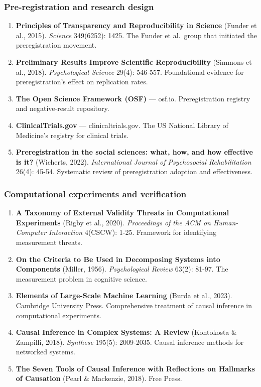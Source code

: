 \documentclass[
]{article}
\begin{document}
\subsubsection{Pre-registration and research
design}\label{pre-registration-and-research-design}

\begin{enumerate}
\def\labelenumi{\arabic{enumi}.}
\setcounter{enumi}{15}
\item
  \textbf{Principles of Transparency and Reproducibility in Science}
  (Funder et al., 2015). \emph{Science} 349(6252): 1425. The Funder et
  al.~group that initiated the preregistration movement.
\item
  \textbf{Preliminary Results Improve Scientific Reproducibility}
  (Simmons et al., 2018). \emph{Psychological Science} 29(4): 546-557.
  Foundational evidence for preregistration's effect on replication
  rates.
\item
  \textbf{The Open Science Framework (OSF)} --- osf.io. Preregistration
  registry and negative-result repository.
\item
  \textbf{ClinicalTrials.gov} --- clinicaltrials.gov. The US National
  Library of Medicine's registry for clinical trials.
\item
  \textbf{Preregistration in the social sciences: what, how, and how
  effective is it?} (Wicherts, 2022). \emph{International Journal of
  Psychosocial Rehabilitation} 26(4): 45-54. Systematic review of
  preregistration adoption and effectiveness.
\end{enumerate}

\subsubsection{Computational experiments and
verification}\label{computational-experiments-and-verification}

\begin{enumerate}
\def\labelenumi{\arabic{enumi}.}
\setcounter{enumi}{20}
\item
  \textbf{A Taxonomy of External Validity Threats in Computational
  Experiments} (Rigby et al., 2020). \emph{Proceedings of the ACM on
  Human-Computer Interaction} 4(CSCW): 1-25. Framework for identifying
  measurement threats.
\item
  \textbf{On the Criteria to Be Used in Decomposing Systems into
  Components} (Miller, 1956). \emph{Psychological Review} 63(2): 81-97.
  The measurement problem in cognitive science.
\item
  \textbf{Elements of Large-Scale Machine Learning} (Burda et al.,
  2023). Cambridge University Press. Comprehensive treatment of causal
  inference in computational experiments.
\item
  \textbf{Causal Inference in Complex Systems: A Review} (Kontokosta \&
  Zampilli, 2018). \emph{Synthese} 195(5): 2009-2035. Causal inference
  methods for networked systems.
\item
  \textbf{The Seven Tools of Causal Inference with Reflections on
  Hallmarks of Causation} (Pearl \& Mackenzie, 2018). Free Press.
\end{enumerate}
\end{document}
